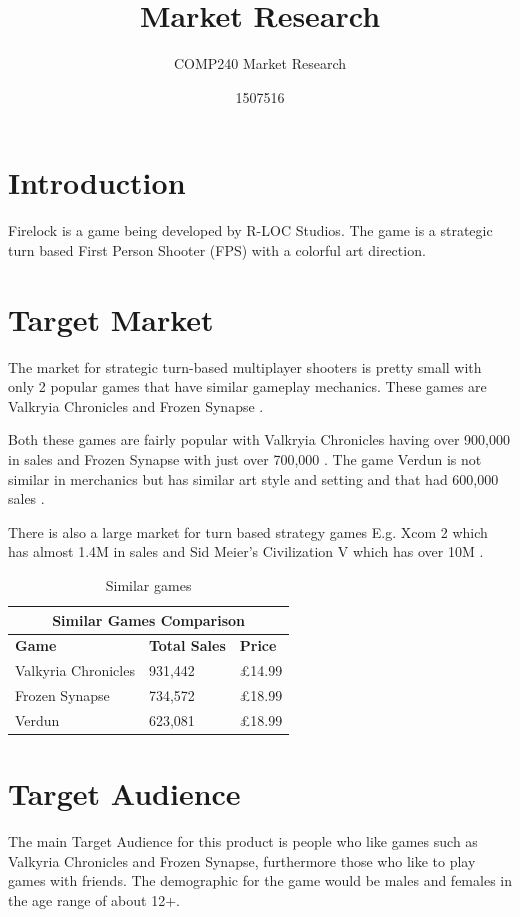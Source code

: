 \documentclass{scrartcl}
\title{Market Research}
\subtitle{COMP240 Market Research}
\author{1507516}
\begin{document}
\maketitle



\section{Introduction}
Firelock is a game being developed by R-LOC Studios. The game is a strategic turn based First Person Shooter (FPS) with a colorful art direction.


\section{Target Market}
The market for strategic turn-based multiplayer shooters is pretty small with only 2 popular games that have similar gameplay mechanics.
These games are Valkryia Chronicles and Frozen Synapse \cite{Valkyria, Frozen}.

 Both these games are fairly popular with Valkryia Chronicles having over 900,000\cite{Valkyria} in sales and Frozen Synapse with just over 700,000 \cite{Frozen}. The game Verdun is not similar in merchanics but has similar art style and setting and that had 600,000 sales \cite{verdun}.

There is also a large market for turn based strategy games E.g. Xcom 2\cite{xcom} which has almost 1.4M in sales and Sid Meier's Civilization V which has over 10M \cite{civV}. 

\begin{table}
	\begin{tabular}{ |p{4cm}||p{3cm}|p{3cm}|  }
		 \hline
		 \multicolumn{3}{|c|}{\textbf{Similar Games Comparison}} \\
		 \hline
		 \textbf{Game} & \textbf{Total Sales} & \textbf{Price} \\
		 \hline
		 Valkyria Chronicles   & 931,442    &\pounds 14.99\\
		 Frozen Synapse  & 734,572  & \pounds 18.99  \\
		 Verdun  & 623,081  & \pounds 18.99  \\
		 \hline
	\end{tabular}
	\caption{Similar games}
	\label{table:similar}
\end{table}

\section{ Target Audience}
The main Target Audience for this product is people who like games such as Valkyria Chronicles and Frozen Synapse, furthermore those who like to play games with friends.
The demographic for the game would be males and females in the age range of about 12+. %
\end{document}

